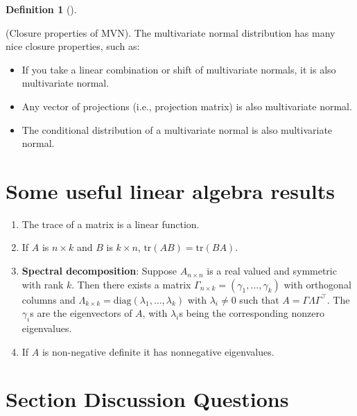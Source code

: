 \documentclass[
  letterpaper,
  DIV=11,
  numbers=noendperiod]{scrreprt}
\theoremstyle{plain}
\theoremstyle{definition}
\newtheorem{definition}{Definition}[chapter]
\theoremstyle{remark}
\begin{document}
\leavevmode{}%
\begin{definition}[]\label{def-closure}

(Closure properties of MVN). The multivariate normal distribution has
many nice closure properties, such as:

\begin{itemize}
\item
  If you take a linear combination or shift of multivariate normals, it
  is also multivariate normal.
\item
  Any vector of projections (i.e., projection matrix) is also
  multivariate normal.
\item
  The conditional distribution of a multivariate normal is also
  multivariate normal.
\end{itemize}

\end{definition}

\hypertarget{some-useful-linear-algebra-results}{%
\section*{Some useful linear algebra
results}\label{some-useful-linear-algebra-results}}


\begin{enumerate}
\def\labelenumi{\arabic{enumi}.}
\item
  The trace of a matrix is a linear function.
\item
  If \(A\) is \(n\times k\) and \(B\) is \(k\times n\),
  \(\mbox{tr}(AB)=\mbox{tr}(BA)\).
\item
  \textbf{Spectral decomposition}: Suppose \(A_{n\times n}\) is a real
  valued and symmetric with rank \(k\). Then there exists a matrix
  \(\Gamma_{n\times k}=(\gamma_{1},\dots,\gamma_{k})\) with orthogonal
  columns and
  \(\Lambda_{k \times k}=\mbox{{diag}}(\lambda_{1},\dots,\lambda_{k})\)
  with \(\lambda_{i}\neq0\) such that \(A=\Gamma\Lambda\Gamma^{\top}\).
  The \(\gamma_{i}\)s are the eigenvectors of \(A\), with
  \(\lambda_{i}\)s being the corresponding nonzero eigenvalues.
\item
  If \(A\) is non-negative definite it has nonnegative eigenvalues.
\end{enumerate}

\hypertarget{section-discussion-questions-5}{%
\section*{Section Discussion
Questions}\label{section-discussion-questions-5}}
\end{document}
